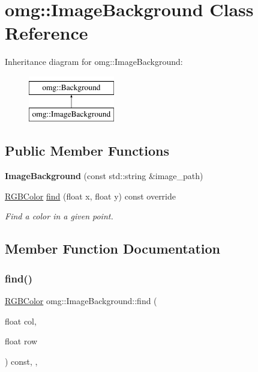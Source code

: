 \hypertarget{classomg_1_1_image_background}{}\section{omg\+::Image\+Background Class Reference}
\label{classomg_1_1_image_background}
Inheritance diagram for omg\+::Image\+Background\+:\begin{figure}[H]
\begin{center}
\leavevmode
\includegraphics[height=2.000000cm]{classomg_1_1_image_background}
\end{center}
\end{figure}
\subsection*{Public Member Functions}
\begin{DoxyCompactItemize}
\item 
\mbox{\label{classomg_1_1_image_background_a7a9d1e74299d4b83f8deaa16673663c5}} 
{\bfseries Image\+Background} (const std\+::string \&image\+\_\+path)
\item 
\mbox{\hyperlink{classtao_1_1_col}{R\+G\+B\+Color}} \mbox{\hyperlink{classomg_1_1_image_background_af1d870d7ec4868d25f3ec4cf724bb8f6}{find}} (float x, float y) const override
\begin{DoxyCompactList}\small\item\em Find a color in a given point. \end{DoxyCompactList}\end{DoxyCompactItemize}


\subsection{Member Function Documentation}
\mbox{\label{classomg_1_1_image_background_af1d870d7ec4868d25f3ec4cf724bb8f6}} 
\subsubsection{\texorpdfstring{find()}{find()}}
{\footnotesize\ttfamily \mbox{\hyperlink{classtao_1_1_col}{R\+G\+B\+Color}} omg\+::\+Image\+Background\+::find (\begin{DoxyParamCaption}\item[{float}]{col,  }\item[{float}]{row }\end{DoxyParamCaption}) const\hspace{0.3cm}{\ttfamily [inline]}, {\ttfamily [override]}, {\ttfamily [virtual]}}




